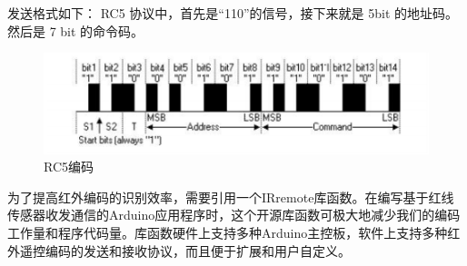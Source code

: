发送格式如下：
RC5 协议中，首先是“110”的信号，接下来就是 5bit 的地址码。然后是 7 bit 的命令码。
\begin{figure}[htbp]
	\centering
	\includegraphics[width=\linewidth]{figure/4-5}
	\caption{RC5编码}
	\label{fig:4-5}
\end{figure}

为了提高红外编码的识别效率，需要引用一个IRremote库函数。在编写基于红线传感器收发通信的Arduino应用程序时，这个开源库函数可极大地减少我们的编码工作量和程序代码量。库函数硬件上支持多种Arduino主控板，软件上支持多种红外遥控编码的发送和接收协议，而且便于扩展和用户自定义。

